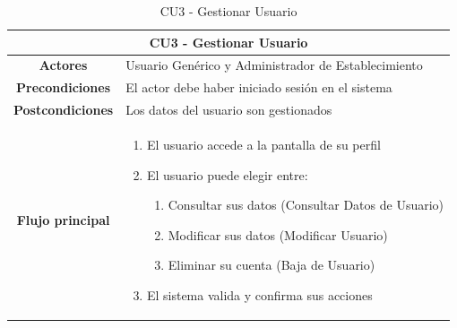\begin{table}[h]
    \centering
    \begin{tabular}{|c|p{10cm}|}
        \hline
        \multicolumn{2}{|c|}{\textbf{CU3 - Gestionar Usuario}}                         \\
        \hline
        \textbf{Actores}         & Usuario Genérico y Administrador de Establecimiento \\
        \hline
        \textbf{Precondiciones}  & El actor debe haber iniciado sesión en el sistema   \\
        \hline
        \textbf{Postcondiciones} & Los datos del usuario son gestionados               \\
        \hline
        \textbf{Flujo principal} & \begin{enumerate}
                                       \item El usuario accede a la pantalla de su perfil
                                       \item El usuario puede elegir entre:
                                             \begin{enumerate}
                      \item Consultar sus datos (Consultar Datos de Usuario)
                      \item Modificar sus datos (Modificar Usuario)
                      \item Eliminar su cuenta (Baja de Usuario)
                  \end{enumerate}
                                       \item El sistema valida y confirma sus acciones
                                   \end{enumerate}   \\
        \hline
    \end{tabular}
    \caption{CU3 - Gestionar Usuario }
\end{table}

